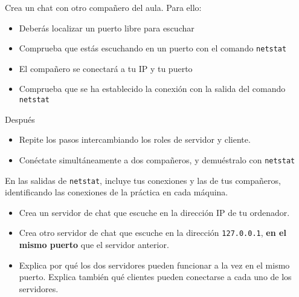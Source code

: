 \begin{homeworkProblem}
  Crea un chat con otro compañero del aula. Para ello:
  \begin{itemize}
  \item Deberás localizar un puerto libre para escuchar
  \item Comprueba que estás escuchando en un puerto con el comando \texttt{netstat}
  \item El compañero se conectará a tu IP y tu puerto
  \item Comprueba que se ha establecido la conexión con la salida del comando \texttt{netstat}
  \end{itemize}

  Después
  \begin{itemize}
  \item Repite los pasos intercambiando los roles de servidor y cliente.
  \item Conéctate simultáneamente a dos compañeros, y demuéstralo con \texttt{netstat}
  \end{itemize}

  En las salidas de \texttt{netstat}, incluye tus conexiones y las de tus compañeros, identificando las conexiones de la práctica en cada máquina.
\end{homeworkProblem}

\begin{homeworkProblem}
  \begin{itemize}
  \item Crea un servidor de chat que escuche en la dirección IP de tu ordenador.
  \item Crea otro servidor de chat que escuche en la dirección \texttt{127.0.0.1}, \textbf{en el mismo puerto} que el servidor anterior.
  \item Explica por qué los dos servidores pueden funcionar a la vez en el mismo puerto. Explica también qué clientes pueden conectarse a cada uno de los servidores.
  \end{itemize}
\end{homeworkProblem}



